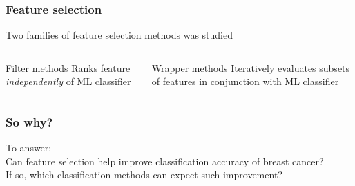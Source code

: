 \documentclass[aspectratio=1610]{beamer}
\begin{document}
\begin{frame}
  \frametitle{\hfill Feature selection}
  Two families of feature selection methods was studied\pause
  \begin{columns}[T]
    \begin{column}{.5\textwidth}
      \begin{block}{Filter methods}
        Ranks feature \textit{independently} of ML classifier\pause
      \end{block}
    \end{column}
    \begin{column}{.5\textwidth}
      \begin{block}{Wrapper methods}
        Iteratively evaluates subsets of features in conjunction with ML classifier
      \end{block}
    \end{column}
  \end{columns}
\end{frame}

\begin{frame}
  \frametitle{\hfill So why?}
  To answer:\\
  \vspace{0.05\textheight}
  Can feature selection help improve classification accuracy of breast cancer?\\
  \vspace{0.05\textheight}
  If so, which classification methods can expect such improvement?\\
\end{frame}

\end{document}
